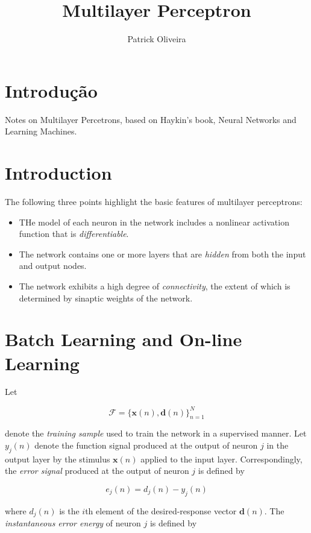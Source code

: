 \documentclass[twocolumn]{article}
\title{Multilayer Perceptron}
\author{Patrick Oliveira}
\affil{}
\begin{document}
\maketitle

\section{Introdução}
	Notes on Multilayer Percetrons, based on Haykin's book, Neural Networks and Learning Machines.

\section{Introduction}
	The following three points highlight the basic features of multilayer perceptrons:

	\begin{itemize}
		\item THe model of each neuron in the network includes a nonlinear activation function that is \textit{differentiable}.
		\item The network contains one or more layers that are \textit{hidden} from both the input and output nodes.
		\item The network exhibits a high degree of \textit{connectivity}, the extent of which is determined by sinaptic weights of the network.
	\end{itemize}

\section{Batch Learning and On-line Learning}

	Let

	$$ \mathcal{F} = \{ \boldsymbol{x} (n), \boldsymbol{d} (n) \}_{n = 1}^{N} $$

	\noindent denote the \textit{training sample} used to train the network in a supervised manner. Let $ y_{j} (n) $ denote the function signal produced at the output of neuron $ j $ in the output layer by the stimulus $ \boldsymbol{x} (n) $ applied to the input layer. Correspondingly, the \textit{error signal} produced at the output of neuron $ j $ is defined by

	$$ e_{j} (n) = d_{j} (n) - y_{j} (n)  $$

	\noindent where $ d_{j} (n) $ is the $ i $th element of the desired-response vector $ \boldsymbol{d} (n) $. The \textit{instantaneous error energy} of neuron $ j $ is defined by
\end{document}
